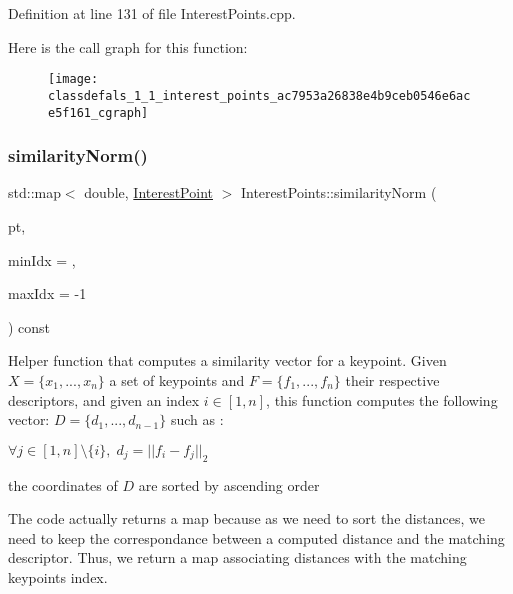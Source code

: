 Definition at line 131 of file Interest\+Points.\+cpp.

Here is the call graph for this function\+:\nopagebreak
\begin{figure}[H]
\begin{center}
\leavevmode
\texttt{[image: classdefals\_1\_1\_interest\_points\_ac7953a26838e4b9ceb0546e6ace5f161\_cgraph]}
\end{center}
\end{figure}
\mbox{\label{classdefals_1_1_interest_points_a2ad567cec93cbf90a4585fafd835a3b6}} 
\subsubsection{\texorpdfstring{similarity\+Norm()}{similarityNorm()}}
{\footnotesize\ttfamily std\+::map$<$ double, \hyperlink{classdefals_1_1_interest_point}{Interest\+Point} $>$ Interest\+Points\+::similarity\+Norm (\begin{DoxyParamCaption}\item[{const \hyperlink{classdefals_1_1_interest_point}{Interest\+Point} \&}]{pt,  }\item[{int}]{min\+Idx = {},  }\item[{int}]{max\+Idx = {\ttfamily -\/1} }\end{DoxyParamCaption}) const}





Helper function that computes a similarity vector for a keypoint. Given $X = \{x_1, ..., x_n\}$ a set of keypoints and $F = \{f_1, ..., f_n\}$ their respective descriptors, and given an index $i \in [1, n]$, this function computes the following vector\+: $D = \{d_1, ..., d_{n-1}\}$ such as \+:
\begin{DoxyItemize}
\item $\forall j \in [1, n]\setminus\lbrace i\rbrace,\; d_j = ||f_i - f_j||_2$
\item the coordinates of $D$ are sorted by ascending order
\end{DoxyItemize}

The code actually returns a map because as we need to sort the distances, we need to keep the correspondance between a computed distance and the matching descriptor. Thus, we return a map associating distances with the matching keypoint\textquotesingle{}s index.

